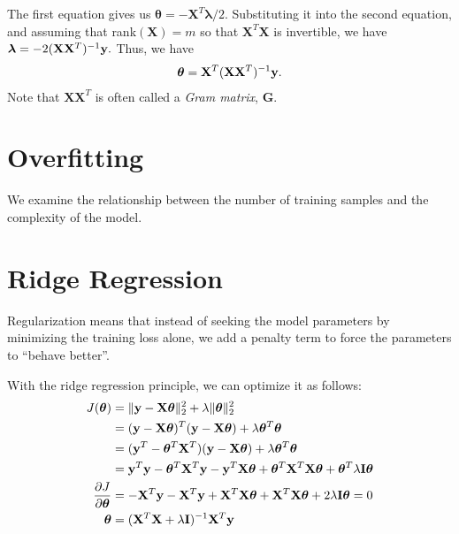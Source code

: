 The first equation gives us $\boldsymbol{\theta} = -\mathbf{X}^T\boldsymbol{\lambda}/2$. Substituting it into the second equation, and assuming that rank$(\mathbf{X})=m$ so that $\mathbf{X}^T\mathbf{X}$ is invertible, we have $\boldsymbol{\lambda} = -2 (\mathbf{X}\mathbf{X}^T)^{-1}{\mathbf{y}}.$ Thus, we have
\begin{align*}
	\boldsymbol{\theta} = \mathbf{X}^T(\mathbf{X}\mathbf{X}^T)^{-1}{\mathbf{y}}.
\end{align*}
Note that $\mathbf{X}\mathbf{X}^T$ is often called a \textit{Gram matrix}, $\mathbf{G}$. 

\section{Overfitting}
We examine the relationship between the number of training samples and the complexity of the model.


\section{Ridge Regression}
Regularization means that instead of seeking the model parameters by minimizing the training loss alone, we add a penalty term to force the parameters to ``behave better''. 


With the ridge regression principle, we can optimize it as follows:
\begin{align}
	J(\boldsymbol{\theta}) &= \|\mathbf{y}-\mathbf{X}\boldsymbol{\theta}\|^2_2 + \lambda \|\boldsymbol{\theta}\|^2_2 \\
			&= (\mathbf{y}-\mathbf{X}\boldsymbol{\theta})^T(\mathbf{y}-\mathbf{X}\boldsymbol{\theta})+\lambda\boldsymbol{\theta}^T\boldsymbol{\theta}\\
			&= (\mathbf{y}^T-\boldsymbol{\theta}^T\mathbf{X}^T)(\mathbf{y}-\mathbf{X}\boldsymbol{\theta})+\lambda\boldsymbol{\theta}^T\boldsymbol{\theta}\\
			&= {\mathbf{y}}^T{\mathbf{y}}-\boldsymbol{\theta}^T\mathbf{X}^T{\mathbf{y}}-{\mathbf{y}}^T\mathbf{X}\boldsymbol{\theta}+\boldsymbol{\theta}^T\mathbf{X}^T\mathbf{X}\boldsymbol{\theta}+\boldsymbol{\theta}^T\lambda\mathbf{I}\boldsymbol{\theta}\\
	\frac{\partial J}{\partial \boldsymbol{\theta}}&= -\mathbf{X}^T{\mathbf{y}}-\mathbf{X}^T{\mathbf{y}}+\mathbf{X}^T\mathbf{X}\boldsymbol{\theta}+\mathbf{X}^T\mathbf{X}\boldsymbol{\theta}+2\lambda\mathbf{I}\boldsymbol{\theta} = 0\\
	\boldsymbol{\theta}	&= (\mathbf{X}^T\mathbf{X}+\lambda\mathbf{I})^{-1}\mathbf{X}^T{\mathbf{y}}
	\label{eq:ridge_regression}
\end{align}

